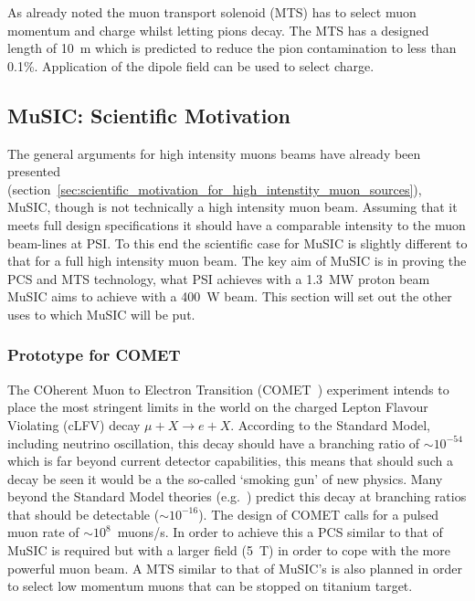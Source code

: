 As already noted the muon transport solenoid (MTS) has to select muon momentum and charge whilst letting pions decay. The MTS has a designed length of 10~m which is predicted to reduce the pion contamination to less than 0.1\%. Application of the dipole field can be used to select charge.

\subsection{MuSIC: Scientific Motivation} %
\label{sec:music_scientific_motivation}
The general arguments for high intensity muons beams have already been presented (section~\ref{sec:scientific_motivation_for_high_intenstity_muon_sources}), MuSIC, though is not technically a high intensity muon beam. Assuming that it meets full design specifications it should have a comparable intensity to the muon beam-lines at PSI. To this end the scientific case for MuSIC is slightly different to that for a full high intensity muon beam. The key aim of MuSIC is in proving the PCS and MTS technology, what PSI achieves with a 1.3~MW proton beam MuSIC aims to achieve with a 400~W beam. This section will set out the other uses to which MuSIC will be put.

\subsubsection{Prototype for COMET} %
\label{sub:prototype_for_comet}
The COherent Muon to Electron Transition (COMET~\cite{comet_cdr}) experiment intends to place the most stringent limits in the world on the charged Lepton Flavour Violating (cLFV) decay \( \mu + X \rightarrow e + X \). According to the Standard Model, including neutrino oscillation, this decay should have a branching ratio of \( \sim 10^{-54} \) which is far beyond current detector capabilities, this means that should such a decay be seen it would be a the so-called `smoking gun' of new physics. Many beyond the Standard Model theories (e.g.\ \cite{clfv_in_susy}) predict this decay at branching ratios that should be detectable (\(\sim 10^{-16}\)). The design of COMET calls for a pulsed muon rate of \( \sim 10^8 \)~muons/s. In order to achieve this a PCS similar to that of MuSIC is required but with a larger field (5~T) in order to cope with the more powerful muon beam. A MTS similar to that of MuSIC's is also planned in order to select low momentum muons that can be stopped on titanium target.


